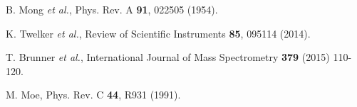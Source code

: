 \documentclass[PhD, copyrightpage]{csuthesis} %
\begin{document}
%


% 
% 
% 
% 
\newpage
 \begin{thebibliography}{00}
 
  B. Mong \emph{ et al.}, Phys. Rev. A \textbf{91}, 022505 (1954).
 
  K. Twelker \emph{ et al.}, Review of Scientific Instruments \textbf{85}, 095114 (2014).
 
  T. Brunner \emph{ et al.}, International Journal of Mass Spectrometry {\color{red}\textbf{379} (2015) 110-120.}
 
  M. Moe, Phys. Rev. C \textbf{44}, R931 (1991).
 \end{thebibliography}
% 
\end{document}
